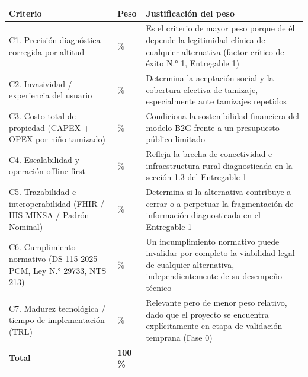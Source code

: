 \documentclass[11pt,a4paper]{article}
\begin{document}
{\small
\begin{longtable}[]{@{}
  >{\raggedright\arraybackslash}p{}
  >{\raggedright\arraybackslash}p{}
  >{\raggedright\arraybackslash}p{}@{}}
\toprule\noalign{}
\begin{minipage}[b]{\linewidth}\raggedright
Criterio
\end{minipage} & \begin{minipage}[b]{\linewidth}\raggedright
Peso
\end{minipage} & \begin{minipage}[b]{\linewidth}\raggedright
Justificación del peso
\end{minipage} \\
\midrule\noalign{}
\endhead
\bottomrule\noalign{}
\endlastfoot
C1. Precisión diagnóstica corregida por altitud & 25 \% & Es el criterio de mayor peso porque de él depende la legitimidad clínica de cualquier alternativa (factor crítico de éxito N.° 1, Entregable 1) \\
C2. Invasividad / experiencia del usuario & 10 \% & Determina la aceptación social y la cobertura efectiva de tamizaje, especialmente ante tamizajes repetidos \\
C3. Costo total de propiedad (CAPEX + OPEX por niño tamizado) & 15 \% & Condiciona la sostenibilidad financiera del modelo B2G frente a un presupuesto público limitado \\
C4. Escalabilidad y operación offline-first & 15 \% & Refleja la brecha de conectividad e infraestructura rural diagnosticada en la sección 1.3 del Entregable 1 \\
C5. Trazabilidad e interoperabilidad (FHIR / HIS-MINSA / Padrón Nominal) & 15 \% & Determina si la alternativa contribuye a cerrar o a perpetuar la fragmentación de información diagnosticada en el Entregable 1 \\
C6. Cumplimiento normativo (DS 115-2025-PCM, Ley N.° 29733, NTS 213) & 15 \% & Un incumplimiento normativo puede invalidar por completo la viabilidad legal de cualquier alternativa, independientemente de su desempeño técnico \\
C7. Madurez tecnológica / tiempo de implementación (TRL) & 5 \% & Relevante pero de menor peso relativo, dado que el proyecto se encuentra explícitamente en etapa de validación temprana (Fase 0) \\
\textbf{Total} & \textbf{100 \%} & \\
\end{longtable}
}
\end{document}
